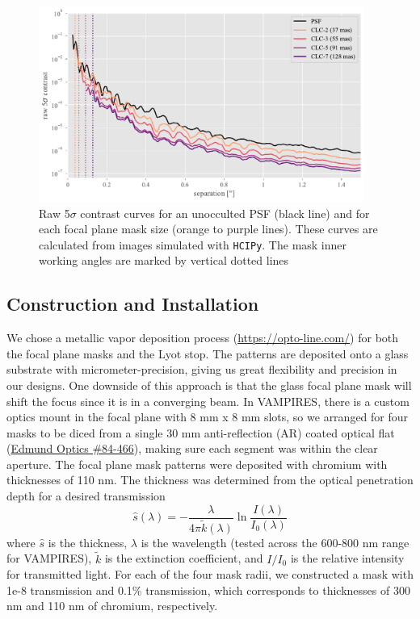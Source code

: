 \documentclass[]{spie}  %
\begin{document}
\begin{figure}
   \centering
   \includegraphics[width=0.95\textwidth]{figures/simulated_curves}
   \caption{Raw 5$\sigma$ contrast curves for an unocculted PSF (black line) and for each focal plane mask size (orange to purple lines). These curves are calculated from images simulated with \texttt{HCIPy}. The mask inner working angles are marked by vertical dotted lines}\label{fig:sim-contrast}
\end{figure}

\subsection{Construction and Installation}\label{sec:install}

We chose a metallic vapor deposition process (\url{https://opto-line.com/}) for both the focal plane masks and the Lyot stop. The patterns are deposited onto a glass substrate with micrometer-precision, giving us great flexibility and precision in our designs. One downside of this approach is that the glass focal plane mask will shift the focus since it is in a converging beam. In VAMPIRES, there is a custom optics mount in the focal plane with 8 mm x 8 mm slots, so we arranged for four masks to be diced from a single 30 mm anti-reflection (AR) coated optical flat (\href{https://www.edmundoptics.com/p/30mm-dia-4mm-thick-nir-i-coated-lambda10-fused-silica-window/27562/}{Edmund Optics \#84-466}), making sure each segment was within the clear aperture. The focal plane mask patterns were deposited with chromium with thicknesses of 110 nm. The thickness was determined from the optical penetration depth for a desired transmission
\begin{equation}
    \hat{s}(\lambda) = -\frac{\lambda}{4\pi\tilde{k}(\lambda)}\ln{\frac{I(\lambda)}{I_0(\lambda)}}
    \label{eqn:throughput}
\end{equation}
where $\hat{s}$ is the thickness, $\lambda$ is the wavelength (tested across the 600-800 nm range for VAMPIRES), $\tilde{k}$ is the extinction coefficient, and $I/I_0$ is the relative intensity for transmitted light. For each of the four mask radii, we constructed a mask with 1e-8 transmission and 0.1\% transmission, which corresponds to thicknesses of 300 nm and 110 nm of chromium, respectively.
\end{document}

